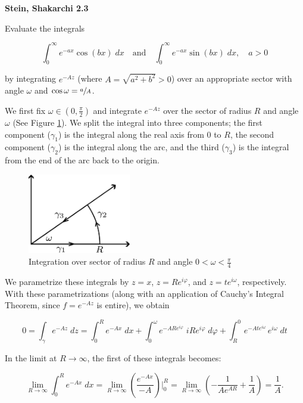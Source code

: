 \textbf{Stein, Shakarchi 2.3}

Evaluate the integrals 

$$
\int_{0}^{\infty} {e^{-ax} \cos{(bx)} \; dx} \quad \text{and} \quad \int_{0}^{\infty} {e^{-ax} \sin{(bx)} \; dx}, \quad a > 0
$$

by integrating $e^{-Az}$ (where $A = \sqrt{a^2 + b^2} > 0$) over an appropriate sector with angle $\omega$ and 
$\cos{\omega} = \sfrac{a}{A}$.

\begin{solution}
    We first fix $\omega \in \left(0, \frac{\pi}{2} \right)$ and integrate $e^{-Az}$ over the sector of radius $R$ and 
    angle $\omega$ (See Figure \ref{fig:problem_3}). We split the integral into three components; the first component 
    ($\gamma_1$) is the integral along the real axis from $0$ to $R$, the second component ($\gamma_2$) is the integral 
    along the arc, and the third ($\gamma_3$) is the integral from the end of the arc back to the origin. 

    \begin{figure}[h]
        \centering
        \includegraphics*[width=0.4\textwidth]{problem_3.png}
        \caption{Integration over sector of radius $R$ and angle $0 < \omega < \frac{\pi}{4}$}
        \label{fig:problem_3}
    \end{figure}
    
    We parametrize these integrals by $z = x$, $z = Re^{i\varphi}$, and $z = t e^{i\omega}$, respectively. With these 
    parametrizations (along with an application of Cauchy's Integral Theorem, since $f = e^{-Az}$ is entire), we obtain

    $$
    0 = \int_{\gamma} {e^{-Az}} \; dz = \int_{0}^{R} {e^{-Ax}} \; dx + \int_{0}^{\omega} {e^{-ARe^{i\varphi}} \; iRe^{i\varphi}} \; d\varphi + \int_{R}^{0} {e^{-Ate^{i\omega}} \, e^{i\omega}} \; dt
    $$

    In the limit at $R \to \infty$, the first of these integrals becomes:

    $$
    \lim_{R \to \infty} \int_{0}^{R} {e^{-Ax}} \; dx = \lim_{R \to \infty} \left( \frac{e^{-Ax}}{-A} \right)\bigg|_{0}^{R} 
                                                     = \lim_{R \to \infty} \left( -\frac{1}{A e^{AR}} + \frac{1}{A} \right)
                                                     = \frac{1}{A}.
    $$


\end{solution}

